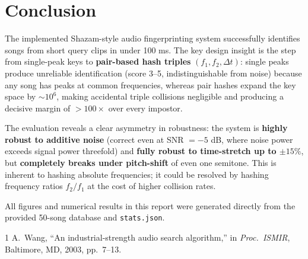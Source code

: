 \documentclass[11pt,a4paper]{article}
\begin{document}
\section{Conclusion}

The implemented Shazam-style audio fingerprinting system successfully identifies songs
from short query clips in under 100 ms. The key design insight is the step from
single-peak keys to \textbf{pair-based hash triples} $(f_1, f_2, \Delta t)$: single
peaks produce unreliable identification (score 3--5, indistinguishable from noise)
because any song has peaks at common frequencies, whereas pair hashes expand the
key space by $\sim$$10^6$, making accidental triple collisions negligible and producing
a decisive margin of $>100\times$ over every impostor.

The evaluation reveals a clear asymmetry in robustness: the system is \textbf{highly
robust to additive noise} (correct even at SNR $= -5$ dB, where noise power exceeds
signal power threefold) and \textbf{fully robust to time-stretch up to $\pm15\%$}, but
\textbf{completely breaks under pitch-shift} of even one semitone. This is inherent to
hashing absolute frequencies; it could be resolved by hashing frequency ratios
$f_2/f_1$ at the cost of higher collision rates.

All figures and numerical results in this report were generated directly from the
provided 50-song database and \texttt{stats.json}.

\begin{thebibliography}{1}
A.\ Wang, ``An industrial-strength audio search algorithm,''
in \textit{Proc.\ ISMIR}, Baltimore, MD, 2003, pp.\ 7--13.
\end{thebibliography}
\end{document}

